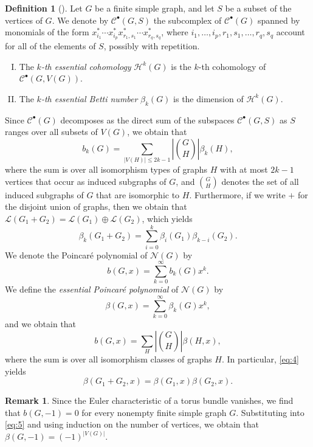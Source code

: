 \documentclass[12pt]{amsart}
\theoremstyle{definition}
\newtheorem{rem}[theorem]{Remark}
\newtheorem{mydef}[theorem]{Definition}
\begin{document}
\begin{mydef}[{\cite[Definition 15]{ABGGLP}}]\label{def:3} Let $G$ be a finite simple graph, and let $S$ be a subset of the vertices of $G$. We denote by $\mathcal C^\bullet(G,S)$ the subcomplex of $\mathcal C^\bullet(G)$ spanned by monomials of the form $x_{i_1}^*\cdots x_{i_p}^*x_{r_1,s_1}^*\cdots x_{r_q,s_q}^*$, where $i_1,\ldots,i_p,r_1,s_1,\ldots,r_q,s_q$ account for all of the elements of $S$, possibly with repetition.

\begin{enumerate}[(I)]
    \item The \emph{$k$-th essential cohomology} $\mathcal H^k(G)$ is the $k$-th cohomology of $\mathcal C^\bullet(G,V(G))$.
    \item The \emph{$k$-th essential Betti number} $\beta_k(G)$ is the dimension of $\mathcal H^k(G)$.
\end{enumerate}

\end{mydef}

Since $\mathcal C^\bullet(G)$ decomposes as the direct sum of the subspaces $\mathcal C^\bullet(G,S)$ as $S$ ranges over all subsets of $V(G)$, we obtain that
\begin{equation}\label{eq:3}
b_k(G)=\sum_{|V(H)|\le 2k-1} \left|\binom{G}{H}\right|\beta_k(H),
\end{equation}
where the sum is over all isomorphism types of graphs $H$ with at most $2k-1$ vertices that occur as induced subgraphs of $G$, and $\binom{G}{H}$ denotes the set of all induced subgraphs of $G$ that are isomorphic to $H$. Furthermore, if we write $+$ for the disjoint union of graphs, then we obtain that $\mathcal L(G_1+G_2)=\mathcal L(G_1)\oplus \mathcal L(G_2)$, which yields
\begin{equation}\label{eq:4}
\beta_k(G_1+G_2)=\sum_{i=0}^k\beta_{i}(G_1)\beta_{k-i}(G_2).
\end{equation}
We denote the Poincar\'e polynomial of $\mathcal N(G)$ by
\[
b(G,x)=\sum_{k=0}^\infty b_k(G) x^k.
\]
We define the \emph{essential Poincar\'e polynomial} of $\mathcal N(G)$ by
\[
\beta(G,x)=\sum_{k=0}^\infty \beta_k(G)x^k,
\]
and we obtain that
\begin{equation}\label{eq:5}
b(G,x)=\sum_H \left|\binom{G}{H}\right|\beta(H,x),
\end{equation}
where the sum is over all isomorphism classes of graphs $H$. In particular, \eqref{eq:4} yields
\[\beta(G_1+G_2,x)=\beta(G_1,x)\beta(G_2,x).\]

\begin{rem}\label{rem:4}
Since the Euler characteristic of a torus bundle vanishes, we find that $b(G,-1)=0$ for every nonempty finite simple graph $G$. Substituting into \eqref{eq:5} and using induction on the number of vertices, we obtain that $\beta(G,-1)=(-1)^{|V(G)|}$.
\end{rem}
\end{document}
